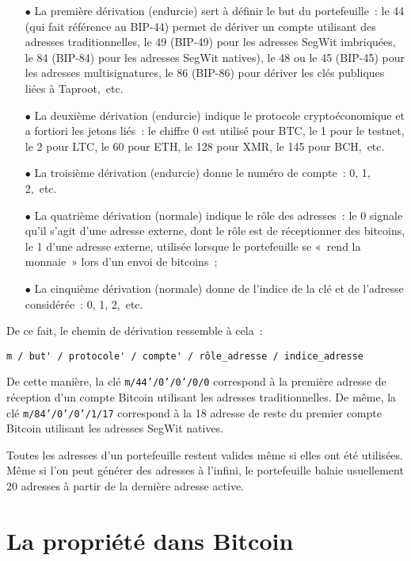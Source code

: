 \begin{itemize}
  \item[$\bullet$] La première dérivation (endurcie) sert à définir le but du portefeuille~: le 44 (qui fait référence au BIP-44) permet de dériver un compte utilisant des adresses traditionnelles, le 49 (BIP-49) pour les adresses SegWit imbriquées, le 84 (BIP-84) pour les adresses SegWit natives), le 48 ou le 45 (BIP-45) pour les adresses multisignatures, le 86 (BIP-86) pour dériver les clés publiques liées à Taproot,~etc.
  \item[$\bullet$] La deuxième dérivation (endurcie) indique le protocole cryptoéconomique et a fortiori les jetons liés~: le chiffre 0 est utilisé pour BTC, le 1 pour le testnet, le 2 pour LTC, le 60 pour ETH, le 128 pour XMR, le 145 pour BCH,~etc.
  \item[$\bullet$] La troisième dérivation (endurcie) donne le numéro de compte~: 0, 1, 2,~etc.
  \item[$\bullet$] La quatrième dérivation (normale) indique le rôle des adresses~: le 0 signale qu'il s'agit d'une adresse externe, dont le rôle est de réceptionner des bitcoins, le 1 d'une adresse externe, utilisée lorsque le portefeuille se «~rend la monnaie~» lors d'un envoi de bitcoins~;
  \item[$\bullet$] La cinquième dérivation (normale) donne de l'indice de la clé et de l'adresse considérée~: 0, 1, 2,~etc.
\end{itemize}

De ce fait, le chemin de dérivation ressemble à cela~:

\begin{Verbatim}[fontsize=\footnotesize]
m / but' / protocole' / compte' / rôle_adresse / indice_adresse
\end{Verbatim}

De cette manière, la clé \texttt{m/44'/0'/0'/0/0} correspond à la première adresse de réception d'un compte Bitcoin utilisant les adresses traditionnelles. De même, la clé \texttt{m/84'/0'/0'/1/17} correspond à la 18\ieme{} adresse de reste du premier compte Bitcoin utilisant les adresses SegWit natives.

Toutes les adresses d'un portefeuille restent valides même si elles ont été utilisées. Même si l'on peut générer des adresses à l'infini, le portefeuille balaie usuellement 20 adresses à partir de la dernière adresse active.

\section*{La propriété dans Bitcoin}

